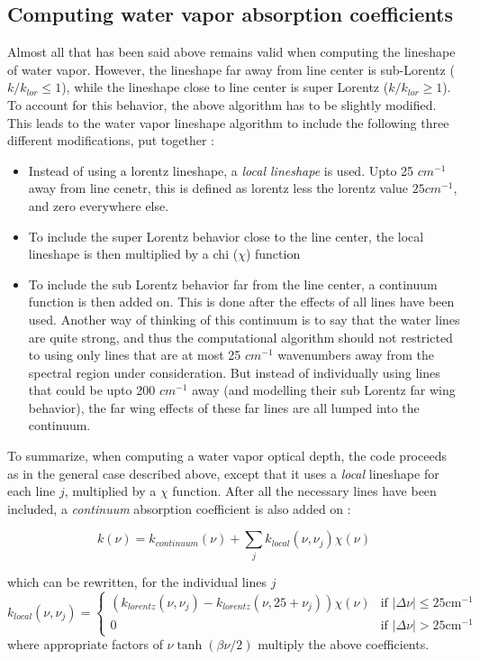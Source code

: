 \documentclass[11pt]{article}
\begin{document}
\subsection{Computing water vapor absorption coefficients}
Almost all that has been said above remains valid when computing the 
lineshape of water vapor. However, the lineshape far away from line 
center is sub-Lorentz ($k/k_{lor} \leq 1$), while the lineshape close to 
line center is super Lorentz ($k/k_{lor} \geq 1$).  To account for this 
behavior, the above algorithm has to be slightly modified. This leads to 
the water vapor lineshape algorithm to include the following three 
different modifications, put together : 
\begin{itemize}
\item Instead of using a lorentz lineshape, a {\it local lineshape} is used.
      Upto 25 $cm^{-1}$ away from line cenetr, this is defined as 
      lorentz less the lorentz value \@ $25 cm^{-1}$, and zero everywhere 
      else.
\item To include the super Lorentz behavior close to the line center, 
      the local lineshape is then multiplied by a chi ($\chi$) function
\item To include the sub Lorentz behavior far from the line center, 
      a continuum function is then added on. This is done after the 
      effects of all lines have been used. Another way of thinking of this 
      continuum is to say that the water lines are quite strong, and thus
      the computational algorithm should not restricted to using only lines
      that are at most 25 $cm^{-1}$ wavenumbers away from the spectral 
      region under consideration. But instead of individually using lines 
      that could be upto 200 $cm^{-1}$ away (and modelling their
      sub Lorentz far wing behavior), the far wing effects of these far 
      lines are all lumped into the continuum.
\end{itemize}

To summarize, when computing a water vapor optical depth, the code proceeds
as in the general case described above, except that it uses a {\it local} 
lineshape for each line $j$, multiplied by a $\chi$ function. After all the 
necessary lines have been included, a {\it continuum} absorption coefficient
is also added on : 

\[
k(\nu) = k_{continuum}(\nu) + \sum_{j} k_{local}(\nu,\nu_{j}) \chi(\nu)
\]

which can be rewritten, for the individual lines $j$
\[
k_{local}(\nu,\nu_{j}) = 
\left\{
\begin{array}{cl}
     ( k_{lorentz}(\nu,\nu_{j}) - k_{lorentz}(\nu,25+\nu_{j}) ) 
           \chi(\nu)    & \mbox{if $|\Delta\nu| \leq 25 \mbox{cm}^{-1}$} \\
        0               & \mbox{if $|\Delta\nu| > 25 \mbox{cm}^{-1}$}
\end{array}
\right. 
\]
where appropriate factors of $\nu\tanh\left(\beta\nu/2\right)$ 
multiply the above coefficients. 
\end{document}
